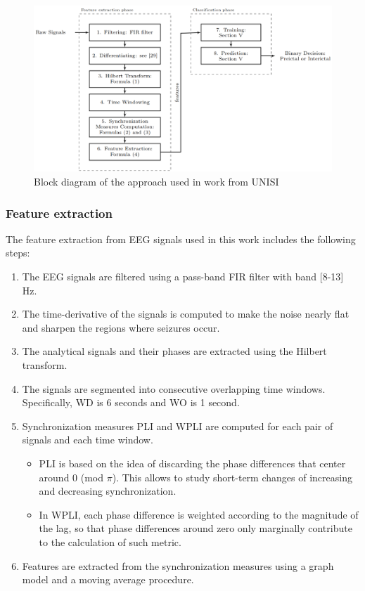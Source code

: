 \begin{figure}[ht]
    \centering
    \includegraphics[width=1.0\textwidth]{images/State-of-art/siena-feature-extraction.png}
    \caption{Block diagram of the approach used in work from \gls{UNISI} \cite{detti_patient-specific_2019}}
    \label{fig:siena-feature-extraction}
\end{figure}


\subsubsection{Feature extraction}
The feature extraction from \gls{EEG} signals used in this work includes the following steps:
\begin{enumerate}
    \item The EEG signals are filtered using a pass-band FIR filter with band [8-13] \unit{Hz}.
    \item The time-derivative of the signals is computed to make the noise nearly flat and sharpen the regions where seizures occur.
    \item The analytical signals and their phases are extracted using the Hilbert transform.
    \item The signals are segmented into consecutive overlapping time windows. 
    Specifically, \gls{WD} is 6 seconds and \gls{WO} is 1 second.
    \item Synchronization measures \gls{PLI} and \gls{WPLI} are computed for each pair of signals and each time window.
        \begin{itemize}
            \item \gls{PLI} is based on the idea of discarding the phase differences that center around 0 (mod $\pi$). This allows to study short-term changes of increasing and decreasing synchronization.
            \item In \gls{WPLI}, each phase difference is weighted according to the magnitude of the lag, so that phase differences around zero only marginally contribute to the calculation of such metric.
        \end{itemize}
    \item Features are extracted from the synchronization measures using a graph model and a moving average procedure.
\end{enumerate}

